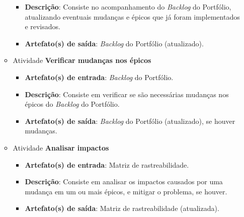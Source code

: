 \begin{itemize}
\begin{itemize}
\begin{itemize}
	      \item \textbf{Descrição}: Consiste no acompanhamento do \textit{Backlog} do Portfólio, atualizando eventuais
		mudanças e épicos que já foram implementados e revisados.
	      
	      \item \textbf{Artefato(s) de saída}: \textit{Backlog} do Portfólio (atualizado).
		    
	    \end{itemize}
	    
	 \item Atividade \textbf{Verificar mudanças nos épicos}
	    
	    \begin{itemize}
	      \item \textbf{Artefato(s) de entrada}: \textit{Backlog} do Portfólio.

	      \item \textbf{Descrição}: Consiste em verificar se são necessárias mudanças nos épicos do
		\textit{Backlog} do Portfólio.
	      
	      \item \textbf{Artefato(s) de saída}: \textit{Backlog} do Portfólio (atualizado), se houver mudanças.
		    
	    \end{itemize}
	    
	 \item Atividade \textbf{Analisar impactos}
	    
	    \begin{itemize}
	      \item \textbf{Artefato(s) de entrada}: Matriz de rastreabilidade.

	      \item \textbf{Descrição}: Consiste em analisar os impactos causados por uma mudança em um ou
		mais épicos, e mitigar o problema, se houver.
	      
	      \item \textbf{Artefato(s) de saída}: Matriz de rastreabilidade (atualizada).
		    
	    \end{itemize}
	    
	\end{itemize}
     
    \end{itemize}
    
    \vfill